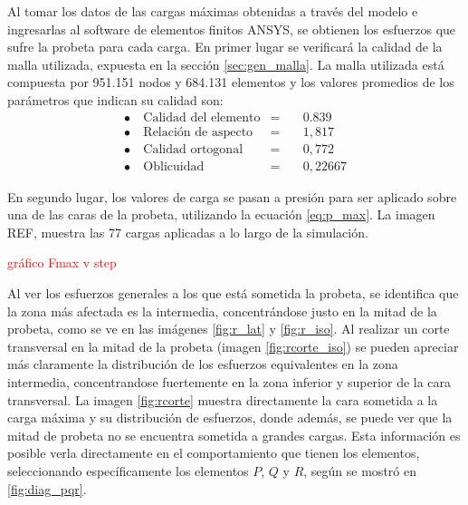 Al tomar los datos de las cargas máximas obtenidas a través del modelo e ingresarlas al software de elementos finitos ANSYS, se obtienen los esfuerzos que sufre la probeta para cada carga. En primer lugar se verificará la calidad de la malla utilizada, expuesta en la sección \ref{sec:gen_malla}. La malla utilizada está compuesta por 951.151 nodos y 684.131 elementos y los valores promedios de los parámetros que indican su calidad son:
\begin{align*}
	\bullet \ &\text{Calidad del elemento} &=\quad	 &0.839 	\\
	\bullet \ &\text{Relación de aspecto}  &=\quad 	 &1,817 	\\
	\bullet \ &\text{Calidad ortogonal} 	 &=\quad 	 &0,772 	\\
	\bullet \ &\text{Oblicuidad} 			 &=\quad	 &0,22667
\end{align*}

En segundo lugar, los valores de carga se pasan a presión para ser aplicado sobre una de las caras de la probeta, utilizando la ecuación \ref{eq:p_max}. La imagen REF, muestra las 77 cargas aplicadas a lo largo de la simulación. 

\textcolor{red}{gráfico Fmax v step}

Al ver los esfuerzos generales a los que está sometida la probeta, se identifica que la zona más afectada es la intermedia, concentrándose justo en la mitad de la probeta, como se ve en las imágenes \ref{fig:r_lat} y \ref{fig:r_iso}. Al realizar un corte transversal en la mitad de la probeta (imagen \ref{fig:rcorte_iso}) se pueden apreciar más claramente la distribución de los esfuerzos equivalentes en la zona intermedia, concentrandose fuertemente en la zona inferior y superior de la cara transversal. La imagen \ref{fig:rcorte} muestra directamente la cara sometida a la carga máxima y su distribución de esfuerzos, donde además, se puede ver que la mitad de probeta no se encuentra sometida a grandes cargas. Esta información es posible verla directamente en el comportamiento que tienen los elementos, seleccionando específicamente los elementos $P$, $Q$ y $R$, según se mostró en \ref{fig:diag_pqr}.

